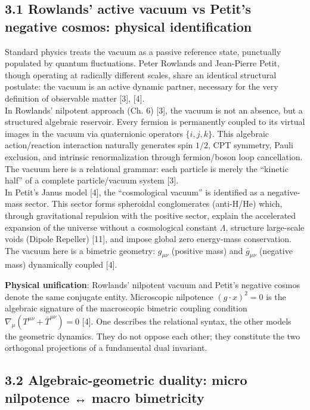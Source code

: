 \documentclass[11pt]{article}
\begin{document}
\hypertarget{rowlands-active-vacuum-vs-petits-negative-cosmos-physical-identification}{%
\subsection{3.1 Rowlands' active vacuum vs Petit's negative cosmos:
physical
identification}\label{rowlands-active-vacuum-vs-petits-negative-cosmos-physical-identification}}

Standard physics treats the vacuum as a passive reference state,
punctually populated by quantum fluctuations. Peter Rowlands and
Jean-Pierre Petit, though operating at radically different scales, share
an identical structural postulate: the vacuum is an active dynamic
partner, necessary for the very definition of observable matter {[}3{]},
{[}4{]}.\\
In Rowlands' nilpotent approach (Ch. 6) {[}3{]}, the vacuum is not an
absence, but a structured algebraic reservoir. Every fermion is
permanently coupled to its virtual images in the vacuum via quaternionic
operators \(\{i, j, k\}\). This algebraic action/reaction interaction
naturally generates spin \(1/2\), CPT symmetry, Pauli exclusion, and
intrinsic renormalization through fermion/boson loop cancellation. The
vacuum here is a relational grammar: each particle is merely the
``kinetic half'' of a complete particle/vacuum system {[}3{]}.\\
In Petit's Janus model {[}4{]}, the ``cosmological vacuum'' is
identified as a negative-mass sector. This sector forms spheroidal
conglomerates (anti-H/He) which, through gravitational repulsion with
the positive sector, explain the accelerated expansion of the universe
without a cosmological constant \(\Lambda\), structure large-scale voids
(Dipole Repeller) {[}11{]}, and impose global zero energy-mass
conservation. The vacuum here is a bimetric geometry: \(g_{\mu\nu}\)
(positive mass) and \(\bar{g}_{\mu\nu}\) (negative mass) dynamically
coupled {[}4{]}.

\textbf{Physical unification}: Rowlands' nilpotent vacuum and Petit's
negative cosmos denote the same conjugate entity. Microscopic nilpotence
\((g\cdot x)^2=0\) is the algebraic signature of the macroscopic
bimetric coupling condition
\(\nabla_\mu(T^{\mu\nu}+\bar{T}^{\mu\nu})=0\) {[}4{]}. One describes the
relational syntax, the other models the geometric dynamics. They do not
oppose each other; they constitute the two orthogonal projections of a
fundamental dual invariant.

\hypertarget{algebraic-geometric-duality-micro-nilpotence-macro-bimetricity}{%
\subsection{3.2 Algebraic-geometric duality: micro nilpotence ↔ macro
bimetricity}\label{algebraic-geometric-duality-micro-nilpotence-macro-bimetricity}}
\end{document}
